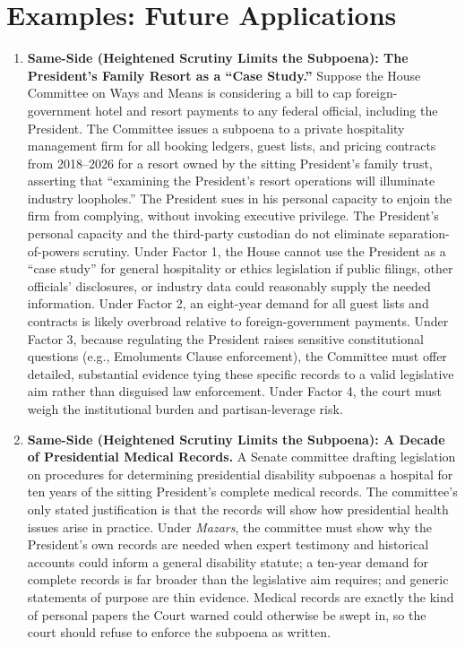 \documentclass[12pt]{article}
\begin{document}
\section{Examples: Future Applications}
\begin{enumerate}

\item \textbf{Same-Side (Heightened Scrutiny Limits the Subpoena): The President's Family Resort as a ``Case Study.''} Suppose the House Committee on Ways and Means is considering a bill to cap foreign-government hotel and resort payments to any federal official, including the President. The Committee issues a subpoena to a private hospitality management firm for all booking ledgers, guest lists, and pricing contracts from 2018--2026 for a resort owned by the sitting President's family trust, asserting that ``examining the President's resort operations will illuminate industry loopholes.'' The President sues in his personal capacity to enjoin the firm from complying, without invoking executive privilege. The President's personal capacity and the third-party custodian do not eliminate separation-of-powers scrutiny. Under Factor 1, the House cannot use the President as a ``case study'' for general hospitality or ethics legislation if public filings, other officials' disclosures, or industry data could reasonably supply the needed information. Under Factor 2, an eight-year demand for all guest lists and contracts is likely overbroad relative to foreign-government payments. Under Factor 3, because regulating the President raises sensitive constitutional questions (e.g., Emoluments Clause enforcement), the Committee must offer detailed, substantial evidence tying these specific records to a valid legislative aim rather than disguised law enforcement. Under Factor 4, the court must weigh the institutional burden and partisan-leverage risk.

\item \textbf{Same-Side (Heightened Scrutiny Limits the Subpoena): A Decade of Presidential Medical Records.} A Senate committee drafting legislation on procedures for determining presidential disability subpoenas a hospital for ten years of the sitting President's complete medical records. The committee's only stated justification is that the records will show how presidential health issues arise in practice. Under \textit{Mazars}, the committee must show why the President's own records are needed when expert testimony and historical accounts could inform a general disability statute; a ten-year demand for complete records is far broader than the legislative aim requires; and generic statements of purpose are thin evidence. Medical records are exactly the kind of personal papers the Court warned could otherwise be swept in, so the court should refuse to enforce the subpoena as written.


\end{enumerate}
\end{document}
